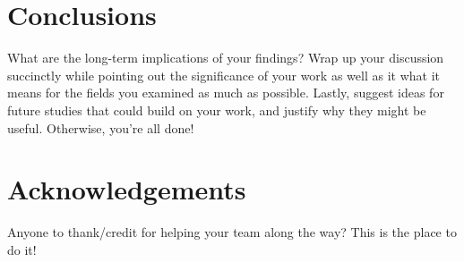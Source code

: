 \documentclass[10pt,twocolumn,letterpaper]{article}
\begin{document}
\section*{Conclusions}
What are the long-term implications of your findings? Wrap up your discussion succinctly while pointing out the significance of your work as well as it what it means for the fields you examined as much as possible. Lastly, suggest ideas for future studies that could build on your work, and justify why they might be useful. Otherwise, you're all done!

\section*{Acknowledgements}
Anyone to thank/credit for helping your team along the way? This is the place to do it!


\end{document}
